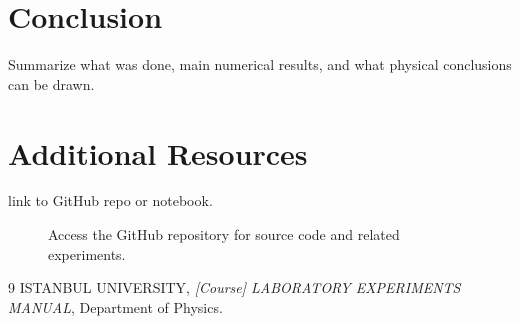 \documentclass[journal]{IEEEtran}
\begin{document}
\section{Conclusion}
Summarize what was done, main numerical results, and what physical conclusions can be drawn.

\section{Additional Resources}
link to GitHub repo or notebook.

\begin{figure}[H]
    \centering
    \begin{minipage}{0.15\textwidth}
        \centering
    \end{minipage}%
    \begin{minipage}{0.2\textwidth}
        \raggedright
        \caption{Access the GitHub repository for source code and related experiments.}
        \label{fig:qr_code}
    \end{minipage}
\end{figure}

\begin{thebibliography}{9}
    ISTANBUL UNIVERSITY, \textit{[Course] LABORATORY EXPERIMENTS MANUAL}, Department of Physics.


\end{thebibliography}
\end{document}
